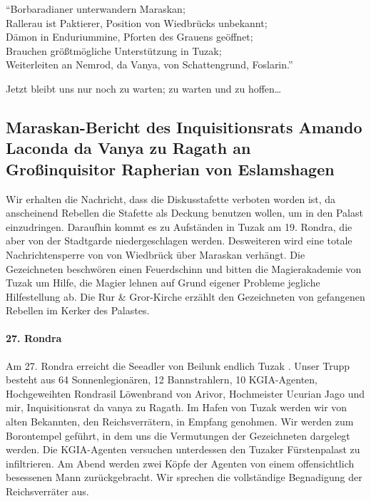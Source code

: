 ``Borbaradianer unterwandern Maraskan;\\
Rallerau ist Paktierer, Position von Wiedbrücks unbekannt;\\
Dämon in Enduriummine, Pforten des Grauens geöffnet;\\
Brauchen größtmögliche Unterstützung in Tuzak;\\
Weiterleiten an Nemrod, da Vanya, von Schattengrund, Foslarin.''

Jetzt bleibt uns nur noch zu warten; zu warten und zu hoffen\dots

\subsection{Maraskan-Bericht des Inquisitionsrats Amando Laconda da Vanya zu Ragath an Großinquisitor Rapherian von Eslamshagen}

Wir erhalten die Nachricht, dass die Diskusstafette verboten worden ist, da anscheinend Rebellen die Stafette als Deckung benutzen wollen, um in den Palast einzudringen. Daraufhin kommt es zu Aufständen in Tuzak am 19. Rondra, die aber von der Stadtgarde niedergeschlagen werden. Desweiteren wird eine totale Nachrichtensperre von von Wiedbrück über Maraskan verhängt. Die Gezeichneten beschwören einen Feuerdschinn und bitten die Magierakademie von Tuzak um Hilfe, die Magier lehnen auf Grund eigener Probleme jegliche Hilfestellung ab. Die Rur \& Gror-Kirche erzählt den Gezeichneten von gefangenen Rebellen im Kerker des Palastes.

\paragraph{27. Rondra}
Am 27. Rondra erreicht die Seeadler von Beilunk endlich Tuzak . Unser Trupp besteht aus 64 Sonnenlegionären, 12 Bannstrahlern, 10 KGIA-Agenten, Hochgeweihten Rondrasil Löwenbrand von Arivor, Hochmeister Ucurian Jago und mir, Inquisitionsrat da vanya zu Ragath. Im Hafen von Tuzak werden wir von alten Bekannten, den Reichsverrätern, in Empfang genohmen. Wir werden zum Borontempel geführt, in dem uns die Vermutungen der Gezeichneten dargelegt werden. Die KGIA-Agenten versuchen unterdessen den Tuzaker Fürstenpalast zu infiltrieren. Am Abend werden zwei Köpfe der Agenten von einem offensichtlich besessenen Mann zurückgebracht. Wir sprechen die vollständige Begnadigung der Reichsverräter aus.

